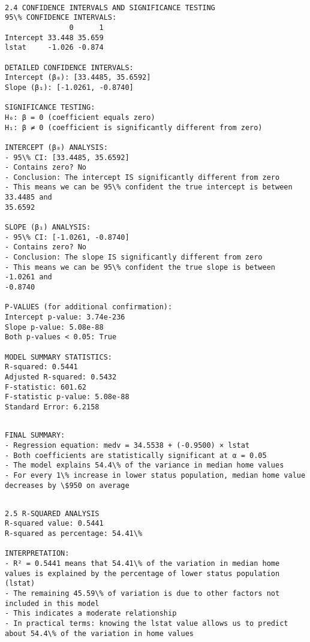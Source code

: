 \documentclass[8pt, twocolumn]{extarticle}
\begin{document}
    \begin{Verbatim}[commandchars=\\\{\}]

2.4 CONFIDENCE INTERVALS AND SIGNIFICANCE TESTING
95\% CONFIDENCE INTERVALS:
               0      1
Intercept 33.448 35.659
lstat     -1.026 -0.874

DETAILED CONFIDENCE INTERVALS:
Intercept (β₀): [33.4485, 35.6592]
Slope (β₁): [-1.0261, -0.8740]

SIGNIFICANCE TESTING:
H₀: β = 0 (coefficient equals zero)
H₁: β ≠ 0 (coefficient is significantly different from zero)

INTERCEPT (β₀) ANALYSIS:
- 95\% CI: [33.4485, 35.6592]
- Contains zero? No
- Conclusion: The intercept IS significantly different from zero
- This means we can be 95\% confident the true intercept is between 33.4485 and
35.6592

SLOPE (β₁) ANALYSIS:
- 95\% CI: [-1.0261, -0.8740]
- Contains zero? No
- Conclusion: The slope IS significantly different from zero
- This means we can be 95\% confident the true slope is between -1.0261 and
-0.8740

P-VALUES (for additional confirmation):
Intercept p-value: 3.74e-236
Slope p-value: 5.08e-88
Both p-values < 0.05: True

MODEL SUMMARY STATISTICS:
R-squared: 0.5441
Adjusted R-squared: 0.5432
F-statistic: 601.62
F-statistic p-value: 5.08e-88
Standard Error: 6.2158
    \end{Verbatim}

    \centering
    \begin{Verbatim}[commandchars=\\\{\}]

FINAL SUMMARY:
- Regression equation: medv = 34.5538 + (-0.9500) × lstat
- Both coefficients are statistically significant at α = 0.05
- The model explains 54.4\% of the variance in median home values
- For every 1\% increase in lower status population, median home value decreases by \$950 on average
    \end{Verbatim}

    \begin{Verbatim}[commandchars=\\\{\}]

2.5 R-SQUARED ANALYSIS
R-squared value: 0.5441
R-squared as percentage: 54.41\%

INTERPRETATION:
- R² = 0.5441 means that 54.41\% of the variation in median home values is explained by the percentage of lower status population (lstat)
- The remaining 45.59\% of variation is due to other factors not included in this model
- This indicates a moderate relationship
- In practical terms: knowing the lstat value allows us to predict about 54.4\% of the variation in home values
    \end{Verbatim}
\end{document}
